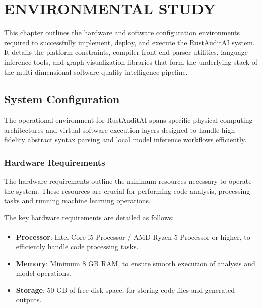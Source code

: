 \chapter{ENVIRONMENTAL STUDY}

\hspace{0.5cm}
This chapter outlines the hardware and software configuration environments required to successfully implement, deploy, and execute the RustAuditAI system. It details the platform constraints, compiler front-end parser utilities, language inference tools, and graph visualization libraries that form the underlying stack of the multi-dimensional software quality intelligence pipeline.

\section{System Configuration}
\hspace{0.5cm}
The operational environment for RustAuditAI spans specific physical computing architectures and virtual software execution layers designed to handle high-fidelity abstract syntax parsing and local model inference workflows efficiently.

\subsection{Hardware Requirements}
\hspace{0.5cm}
The hardware requirements outline the minimum resources necessary to operate the system. These resources are crucial for performing code analysis, processing tasks and running machine learning operations.

The key hardware requirements are detailed as follows:


\begin{itemize}
\item \textbf{Processor}: Intel\textsuperscript{\textregistered} Core\textsuperscript{\texttrademark} i5 Processor / AMD Ryzen\textsuperscript{\texttrademark} 5 Processor or higher, to efficiently handle code processing tasks.

\item \textbf{Memory}: Minimum 8 GB RAM, to ensure smooth execution of analysis and model operations.

\item \textbf{Storage}: 50 GB of free disk space, for storing code files and generated outputs.
\end{itemize}

